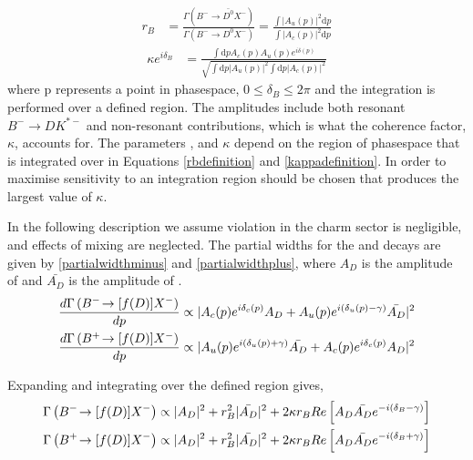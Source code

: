 \begin{align}
r_B &= \frac{\Gamma(B^- \to \bar{D^0}X^-)}{\Gamma(B^- \to D^0X^-)} = \frac{\int \left|A_u(p)\right|^2 \mathrm{d}p}{\int \left|A_c(p)\right|^2 \mathrm{d}p}
\label{rbdefinition}
\end{align}
\begin{align}
\kappa e^{i\delta_B} &= \frac{\int \mathrm{d}p A_c(p)A_u(p)e^{i\delta(p)}}{\sqrt{\int \mathrm{d}p \left|A_u(p)\right|^2 \int \mathrm{d}p \left|A_c(p)\right|^2}}
\label{kappadefinition}
\end{align}
where p represents a point in phasespace, $0 \leq \delta_B \leq 2\pi$ and the integration is performed over a defined \Kstarm region. The amplitudes include both resonant $B^- \to DK^{*-}$ and non-resonant \decay{\Bm}{\D\KS\pim} contributions, which is what the coherence factor, $\kappa$, accounts for. The parameters \rb, \deltab and $\kappa$ depend on the region of \decay{\Bm}{\D\KS\pim} phasespace that is integrated over in Equations \ref{rbdefinition} and \ref{kappadefinition}. In order to maximise sensitivity to \Pgamma an integration region should be chosen that produces the largest value of $\kappa$.

In the following description we assume \CP violation in the charm sector is negligible, and effects of \D mixing are neglected. The partial widths for the \Bm and \Bp decays are given by \eqn\ref{partialwidthminus} and \ref{partialwidthplus}, where $A_D$ is the amplitude of  and $\bar{A_{D}}$ is the amplitude of .
\begin{align}
\frac{d\Gamma\left({{{B}^-}}\!\rightarrow [f(D)]X^-\right)}{dp} &\propto | A_c(p) e^{i\delta_c(p)}A_{D} + A_u(p) e^{i(\delta_u(p) - \gamma)}\bar{A_{D}} |^2 \label{partialwidthminus} \\
\frac{d\Gamma\left({{{B}^+}}\!\rightarrow [f(D)]X^-\right)}{dp} &\propto | A_u(p) e^{i(\delta_u(p) + \gamma)}\bar{A_{D}} + A_c(p) e^{i\delta_c(p)}A_{D} |^2 \label{partialwidthplus}
\end{align}

Expanding and integrating over the defined \Kstar region gives,
\begin{align}
\Gamma\left({{{B}^-}}\!\rightarrow [f(D)]X^-\right) &\propto |A_D|^2 + r_B^2 |\bar{A_{D}}|^2 + 2\kappa r_B Re\left[ A_D \bar{A_{D}} e^{-i(\delta_B - \gamma)} \right] \label{BandDdecaysminus} \\
\Gamma\left({{{B}^+}}\!\rightarrow [f(D)]X^-\right) &\propto |A_D|^2 + r_B^2 |\bar{A_{D}}|^2 + 2\kappa r_B Re\left[ A_D \bar{A_{D}} e^{-i(\delta_B + \gamma)} \right] \label{BandDdecaysplus}
\end{align}

